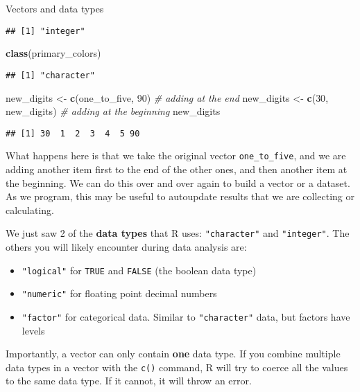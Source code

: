 \documentclass[
  11pt,
  ignorenonframetext,
]{beamer}
\newenvironment{Shaded}{\begin{snugshade}}{\end{snugshade}}
\newcommand{\CommentTok}[1]{\textcolor[rgb]{0.56,0.35,0.01}{\textit{#1}}}
\newcommand{\DecValTok}[1]{\textcolor[rgb]{0.00,0.00,0.81}{#1}}
\newcommand{\KeywordTok}[1]{\textcolor[rgb]{0.13,0.29,0.53}{\textbf{#1}}}
\newcommand{\NormalTok}[1]{#1}
\newcommand{\StringTok}[1]{\textcolor[rgb]{0.31,0.60,0.02}{#1}}
\providecommand{\tightlist}{%
  \setlength{\itemsep}{0pt}\setlength{\parskip}{0pt}}
\begin{document}
\begin{frame}[fragile]{Vectors and data types}
\begin{verbatim}
## [1] "integer"
\end{verbatim}

\begin{Shaded}
\begin{Highlighting}[]
\KeywordTok{class}\NormalTok{(primary_colors)}
\end{Highlighting}
\end{Shaded}

\begin{verbatim}
## [1] "character"
\end{verbatim}

\begin{Shaded}
\begin{Highlighting}[]
\NormalTok{new_digits <-}\StringTok{ }\KeywordTok{c}\NormalTok{(one_to_five, }\DecValTok{90}\NormalTok{) }\CommentTok{# adding at the end}
\NormalTok{new_digits <-}\StringTok{ }\KeywordTok{c}\NormalTok{(}\DecValTok{30}\NormalTok{, new_digits) }\CommentTok{# adding at the beginning}
\NormalTok{new_digits}
\end{Highlighting}
\end{Shaded}

\begin{verbatim}
## [1] 30  1  2  3  4  5 90
\end{verbatim}

What happens here is that we take the original vector
\texttt{one\_to\_five}, and we are adding another item first to the end
of the other ones, and then another item at the beginning. We can do
this over and over again to build a vector or a dataset. As we program,
this may be useful to autoupdate results that we are collecting or
calculating.

We just saw 2 of the \textbf{data types} that R uses:
\texttt{"character"} and \texttt{"integer"}. The others you will likely
encounter during data analysis are:

\begin{itemize}
\tightlist
\item
  \texttt{"logical"} for \texttt{TRUE} and \texttt{FALSE} (the boolean
  data type)
\item
  \texttt{"numeric"} for floating point decimal numbers\\
\item
  \texttt{"factor"} for categorical data. Similar to
  \texttt{"character"} data, but factors have levels
\end{itemize}

Importantly, a vector can only contain \textbf{one} data type. If you
combine multiple data types in a vector with the \texttt{c()} command, R
will try to coerce all the values to the same data type. If it cannot,
it will throw an error.


\end{frame}
\end{document}
